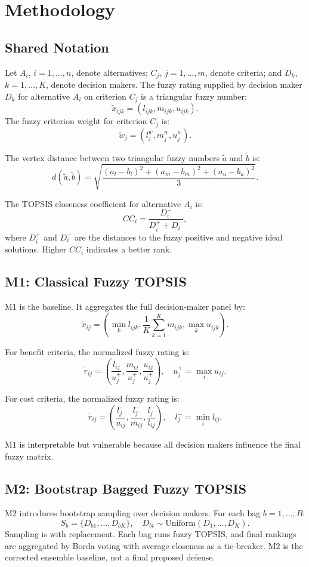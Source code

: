 \chapter{Methodology}

\section{Shared Notation}
Let \(A_i\), \(i=1,\ldots,n\), denote alternatives; \(C_j\), \(j=1,\ldots,m\), denote criteria; and \(D_k\), \(k=1,\ldots,K\), denote decision makers. The fuzzy rating supplied by decision maker \(D_k\) for alternative \(A_i\) on criterion \(C_j\) is a triangular fuzzy number:
\[
\tilde{x}_{ijk}=(l_{ijk},m_{ijk},u_{ijk}).
\]
The fuzzy criterion weight for criterion \(C_j\) is:
\[
\tilde{w}_j=(l_j^w,m_j^w,u_j^w).
\]

The vertex distance between two triangular fuzzy numbers \(\tilde{a}\) and \(\tilde{b}\) is:
\[
d(\tilde{a},\tilde{b}) =
\sqrt{
\frac{(a_l-b_l)^2+(a_m-b_m)^2+(a_u-b_u)^2}{3}
}.
\]

The TOPSIS closeness coefficient for alternative \(A_i\) is:
\[
CC_i = \frac{D_i^-}{D_i^+ + D_i^-},
\]
where \(D_i^+\) and \(D_i^-\) are the distances to the fuzzy positive and negative ideal solutions. Higher \(CC_i\) indicates a better rank.

\section{M1: Classical Fuzzy TOPSIS}
M1 is the baseline. It aggregates the full decision-maker panel by:
\[
\tilde{x}_{ij} =
\left(
\min_k l_{ijk},
\frac{1}{K}\sum_{k=1}^{K} m_{ijk},
\max_k u_{ijk}
\right).
\]

For benefit criteria, the normalized fuzzy rating is:
\[
\tilde{r}_{ij} =
\left(
\frac{l_{ij}}{u_j^+},
\frac{m_{ij}}{u_j^+},
\frac{u_{ij}}{u_j^+}
\right),
\quad
u_j^+ = \max_i u_{ij}.
\]

For cost criteria, the normalized fuzzy rating is:
\[
\tilde{r}_{ij} =
\left(
\frac{l_j^-}{u_{ij}},
\frac{l_j^-}{m_{ij}},
\frac{l_j^-}{l_{ij}}
\right),
\quad
l_j^- = \min_i l_{ij}.
\]

M1 is interpretable but vulnerable because all decision makers influence the final fuzzy matrix.

\section{M2: Bootstrap Bagged Fuzzy TOPSIS}
M2 introduces bootstrap sampling over decision makers. For each bag \(b=1,\ldots,B\):
\[
S_b = \{D_{b1},\ldots,D_{bK}\}, \quad D_{bt}\sim \text{Uniform}(D_1,\ldots,D_K).
\]
Sampling is with replacement. Each bag runs fuzzy TOPSIS, and final rankings are aggregated by Borda voting with average closeness as a tie-breaker. M2 is the corrected ensemble baseline, not a final proposed defense.

